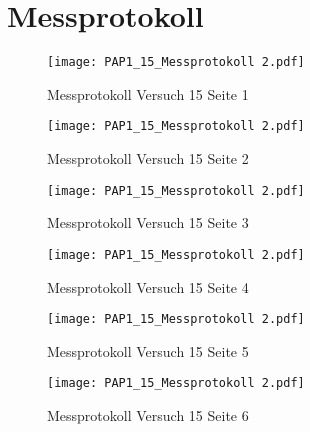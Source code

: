 \section{Messprotokoll}
\begin{figure}[h!]
    \centering
    \texttt{[image: PAP1\_15\_Messprotokoll 2.pdf]}
    \caption{Messprotokoll Versuch 15 Seite 1}
\end{figure}
\clearpage
\newpage
\begin{figure}[h!]
    \centering
    \texttt{[image: PAP1\_15\_Messprotokoll 2.pdf]}
    \caption{Messprotokoll Versuch 15 Seite 2}
\end{figure}
\newpage
\begin{figure}[h!]
    \centering
    \texttt{[image: PAP1\_15\_Messprotokoll 2.pdf]}
    \caption{Messprotokoll Versuch 15  Seite 3}
\end{figure}
\newpage
\begin{figure}[h!]
    \centering
    \texttt{[image: PAP1\_15\_Messprotokoll 2.pdf]}
    \caption{Messprotokoll Versuch 15 Seite 4}
\end{figure}
\newpage
\begin{figure}[h!]
    \centering
    \texttt{[image: PAP1\_15\_Messprotokoll 2.pdf]}
    \caption{Messprotokoll Versuch 15  Seite 5}
\end{figure}
\newpage
\begin{figure}[h!]
    \centering
    \texttt{[image: PAP1\_15\_Messprotokoll 2.pdf]}
    \caption{Messprotokoll Versuch 15 Seite 6}
\end{figure}
\newpage